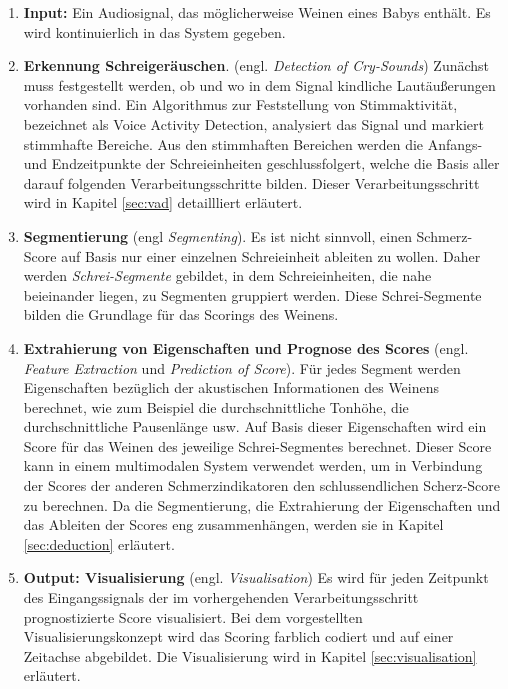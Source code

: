 \begin{enumerate}[leftmargin=*]
	\item \textbf{Input: } Ein Audiosignal, das möglicherweise Weinen eines Babys enthält. Es wird kontinuierlich in das System gegeben.
	
	\item \textbf{Erkennung Schreigeräuschen}. (engl. \emph{Detection of Cry-Sounds}) Zunächst muss festgestellt werden, ob und wo in dem Signal kindliche Lautäußerungen vorhanden sind. Ein Algorithmus zur Feststellung von Stimmaktivität, bezeichnet als Voice Activity Detection, analysiert das Signal und markiert stimmhafte Bereiche. Aus den stimmhaften Bereichen werden die Anfangs- und Endzeitpunkte der Schreieinheiten geschlussfolgert, welche die Basis aller darauf folgenden Verarbeitungsschritte bilden. Dieser Verarbeitungsschritt wird in Kapitel \ref{sec:vad} detaillliert erläutert.
	
	\item \textbf{Segmentierung} (engl \emph{Segmenting}). Es ist nicht sinnvoll, einen Schmerz-Score auf Basis nur einer einzelnen Schreieinheit ableiten zu wollen. Daher werden \emph{Schrei-Segmente} gebildet, in dem Schreieinheiten, die nahe beieinander liegen, zu Segmenten gruppiert werden. Diese Schrei-Segmente bilden die Grundlage für das Scorings des Weinens. 
		
	\item \textbf{Extrahierung von Eigenschaften und Prognose des Scores} (engl. \emph{Feature Extraction} und \emph{Prediction of Score}). Für jedes Segment werden Eigenschaften bezüglich der akustischen Informationen des Weinens berechnet, wie zum Beispiel die durchschnittliche Tonhöhe, die durchschnittliche Pausenlänge usw. Auf Basis dieser Eigenschaften wird ein Score für das Weinen des jeweilige Schrei-Segmentes berechnet. Dieser Score kann in einem multimodalen System verwendet werden, um in Verbindung der Scores der anderen Schmerzindikatoren den schlussendlichen Scherz-Score zu berechnen. Da die Segmentierung, die Extrahierung der Eigenschaften und das Ableiten der Scores eng zusammenhängen, werden sie in Kapitel \ref{sec:deduction} erläutert.
	
	\item \textbf{Output: Visualisierung} (engl. \emph{Visualisation}) Es wird für jeden Zeitpunkt des Eingangssignals der im vorhergehenden Verarbeitungsschritt prognostizierte Score visualisiert. Bei dem vorgestellten Visualisierungskonzept wird das Scoring farblich codiert und auf einer Zeitachse abgebildet. Die Visualisierung wird in Kapitel \ref{sec:visualisation} erläutert.	
	
	\end{enumerate}


